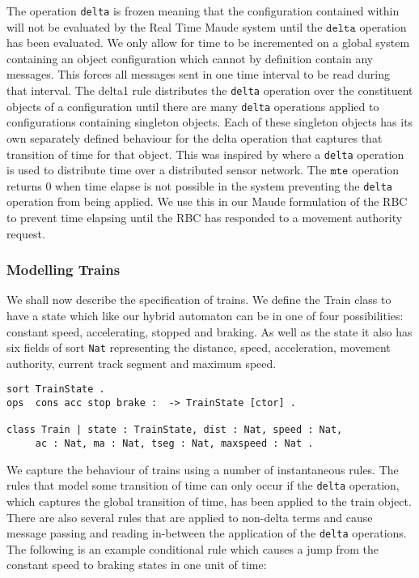 The operation \texttt{delta} is frozen meaning that the configuration contained within will not be evaluated by the Real Time Maude system until the $\texttt{delta}$ operation has been evaluated. We only allow for time to be incremented on a global system containing an object configuration which cannot by definition contain any messages. This forces all messages sent in one time interval to be read during that interval. The delta1 rule distributes the \texttt{delta} operation over the constituent objects of a configuration until there are many \texttt{delta} operations applied to configurations containing singleton objects. Each of these singleton objects has its own separately defined behaviour for the delta operation that captures that transition of time for that object. This was inspired by \cite{PO07} where a \texttt{delta} operation is used to distribute time over a distributed sensor network. The $\texttt{mte}$ operation returns 0 when time elapse is not possible in the system preventing the \texttt{delta} operation from being applied. We use this in our Maude formulation of the RBC to prevent time elapsing until the RBC has responded to a movement authority request.

\subsubsection*{Modelling Trains}
We shall now describe the specification of trains. We define the Train class to have a state which like our hybrid automaton can be in one of four possibilities: constant speed, accelerating, stopped and braking. As well as the state it also has six fields of sort \texttt{Nat} representing the distance, speed, acceleration, movement authority,  current track segment and maximum speed.

\begin{lstlisting}
sort TrainState .
ops  cons acc stop brake :  -> TrainState [ctor] .

class Train | state : TrainState, dist : Nat, speed : Nat, 
     ac : Nat, ma : Nat, tseg : Nat, maxspeed : Nat .
\end{lstlisting}

We capture the behaviour of trains using a number of instantaneous rules. The rules that model some transition of time can only occur if the \texttt{delta} operation, which captures the global transition of time, has been applied to the train object. There are also several rules that are applied to non-delta terms and cause message passing and reading in-between the application of the \texttt{delta} operations. The following is an example conditional rule which causes a jump from the constant speed to braking states in one unit of time:

